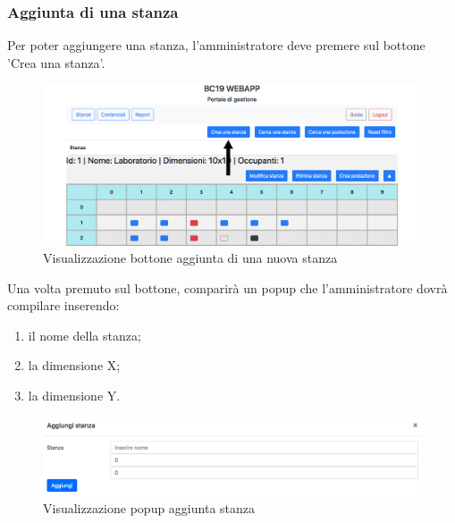 \subsubsection{Aggiunta di una stanza}
Per poter aggiungere una stanza, l'amministratore deve premere sul bottone 'Crea una stanza'.
\begin{figure}[H]
	\centering
	\includegraphics[width=15cm]{res/images/bottoneAddRoom.png}
	\caption{Visualizzazione bottone aggiunta di una nuova stanza}
\end{figure}
Una volta premuto sul bottone, comparirà un popup che l'amministratore dovrà compilare inserendo:
\begin{enumerate}
	\item il nome della stanza;
	\item la dimensione X;
	\item la dimensione Y.
\end{enumerate}
\begin{figure}[H]
	\centering
	\includegraphics[width=15cm]{res/images/aggiungiStanza1.png}
	\caption{Visualizzazione popup aggiunta stanza}
\end{figure}

